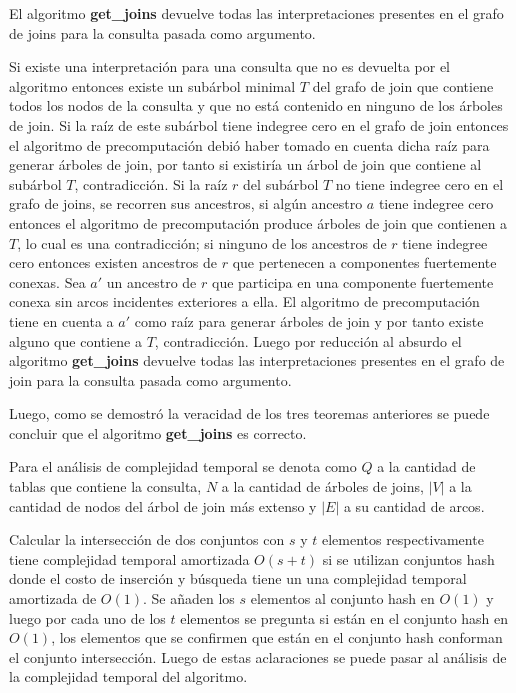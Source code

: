 \begin{theorem}
    El algoritmo \textbf{get\_joins} devuelve todas las interpretaciones presentes en el grafo de joins 
    para la consulta pasada como argumento.
\end{theorem}

Si existe una interpretaci\'on para una consulta que no es devuelta por el algoritmo entonces 
existe un sub\'arbol minimal $T$ del grafo de join que contiene todos los nodos de la consulta y que no est\'a contenido 
en ninguno de los \'arboles de join. Si la raíz de este sub\'arbol tiene indegree cero en el grafo de join entonces 
el algoritmo de precomputaci\'on debi\'o haber tomado en cuenta dicha ra\'iz para generar \'arboles de join, 
por tanto si existir\'ia un \'arbol de join que contiene al sub\'arbol $T$, contradicción. Si la ra\'iz $r$ del 
sub\'arbol $T$ no tiene indegree cero en el grafo de joins, se recorren sus ancestros, si algún ancestro $a$ tiene 
indegree cero entonces el algoritmo de precomputaci\'on produce \'arboles de join que contienen a $T$, lo 
cual es una contradicción; si ninguno de los ancestros de $r$ tiene indegree cero entonces existen 
ancestros de $r$ que pertenecen a componentes fuertemente conexas. Sea $a'$ un ancestro de $r$ que 
participa en una componente fuertemente conexa sin arcos incidentes exteriores a ella. El algoritmo 
de precomputaci\'on tiene en cuenta a $a'$ como ra\'iz para generar \'arboles de join y por tanto 
existe alguno que contiene a $T$, contradicción. Luego por reducci\'on al absurdo el algoritmo 
\textbf{get\_joins} devuelve todas las interpretaciones presentes en el grafo de join 
para la consulta pasada como argumento.

Luego, como se demostr\'o la veracidad de los tres teoremas anteriores se puede concluir que el 
algoritmo \textbf{get\_joins} es correcto.

Para el análisis de complejidad temporal se denota como $Q$ a la cantidad de tablas que contiene la consulta, 
$N$ a la cantidad de \'arboles de joins, $|V|$ a la cantidad de nodos del \'arbol de join m\'as extenso y $|E|$
a su cantidad de arcos. 

Calcular la intersección de dos conjuntos con $s$ y $t$ elementos respectivamente tiene 
complejidad temporal amortizada $O(s + t)$ si se utilizan conjuntos hash donde el costo de inserción y b\'usqueda 
tiene un una complejidad temporal amortizada de $O(1)$. Se añaden los $s$ elementos al conjunto hash en $O(1)$
y luego por cada uno de los $t$ elementos se pregunta si est\'an en el conjunto hash en $O(1)$, los elementos 
que se confirmen que est\'an en el conjunto hash conforman el conjunto intersección. Luego de estas aclaraciones 
se puede pasar al análisis de la complejidad temporal del algoritmo.

